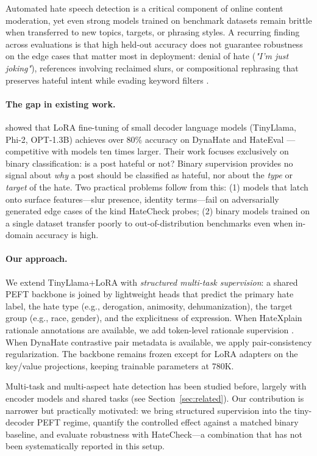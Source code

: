 \documentclass{article}
\newcommand{\eg}{e.g.,\xspace}
\begin{document}
Automated hate speech detection is a critical component of online content
moderation, yet even strong models trained on benchmark datasets remain
brittle when transferred to new topics, targets, or phrasing styles.
A recurring finding across evaluations is that high held-out accuracy does not
guarantee robustness on the edge cases that matter most in deployment: denial
of hate (\textit{"I'm just joking"}), references involving reclaimed slurs, or
compositional rephrasing that preserves hateful intent while evading keyword
filters \citep{rottger2021hatecheck}.

\paragraph{The gap in existing work.}
\citet{sen2024hatetinyllm} showed that LoRA fine-tuning of small decoder
language models (TinyLlama, Phi-2, OPT-1.3B) achieves over 80\% accuracy on
DynaHate \citep{vidgen2021dynahate} and HateEval \citep{basile2019semeval}—
competitive with models ten times larger.
Their work focuses exclusively on binary classification: is a post hateful or not?
Binary supervision provides no signal about \emph{why} a post should be
classified as hateful, nor about the \emph{type} or \emph{target} of the hate.
Two practical problems follow from this: (1) models that latch onto surface
features—slur presence, identity terms—fail on adversarially generated edge
cases of the kind HateCheck probes; (2) binary models trained on a single dataset
transfer poorly to out-of-distribution benchmarks even when in-domain accuracy
is high.

\paragraph{Our approach.}
We extend TinyLlama+LoRA with \emph{structured multi-task supervision}: a shared
PEFT backbone is joined by lightweight heads that predict the primary hate label,
the hate type (\eg derogation, animosity, dehumanization), the target group
(\eg race, gender), and the explicitness of expression.
When HateXplain rationale annotations are available, we add token-level rationale
supervision \citep{mathew2021hatexplain}.
When DynaHate contrastive pair metadata is available, we apply pair-consistency
regularization.
The backbone remains frozen except for LoRA adapters on the key/value projections,
keeping trainable parameters at 780K.

Multi-task and multi-aspect hate detection has been studied before, largely with
encoder models and shared tasks (see Section~\ref{sec:related}).
Our contribution is narrower but practically motivated: we bring structured
supervision into the tiny-decoder PEFT regime, quantify the controlled effect
against a matched binary baseline, and evaluate robustness with HateCheck—a
combination that has not been systematically reported in this setup.
\end{document}
